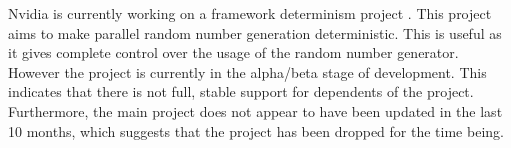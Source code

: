 Nvidia is currently working on a framework determinism project \cite{projectFrameDeter}.
This project aims to make parallel random number generation deterministic.
This is useful as it gives complete control over the usage of the random number generator.
However the project is currently in the alpha/beta stage of development.
This indicates that there is not full, stable support for dependents of the project.
Furthermore, the main project does not appear to have been updated in the last 10 months, which suggests that the project has been dropped for the time being.











